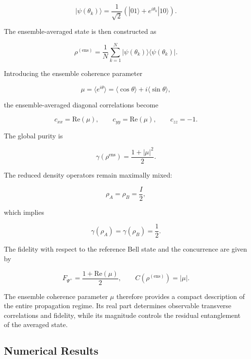 \begin{equation}
|\psi(\theta_k)\rangle
=
\frac{1}{\sqrt{2}}
\left(
|01\rangle + e^{i\theta_k}|10\rangle
\right).
\label{eq:random_phase_realization}
\end{equation}

The ensemble-averaged state is then constructed as

\begin{equation}
\rho^{\mathrm{(ens)}}
=
\frac{1}{N}
\sum_{k=1}^{N}
|\psi(\theta_k)\rangle
\langle\psi(\theta_k)|.
\label{eq:random_phase_ensemble_density_operator}
\end{equation}

Introducing the ensemble coherence parameter

\begin{equation}
\mu
=
\langle e^{i\theta} \rangle
=
\langle \cos\theta \rangle
+
i
\langle \sin\theta \rangle,
\label{eq:ensemble_coherence_parameter}
\end{equation}

the ensemble-averaged diagonal correlations become

\[
c_{xx}
=
\mathrm{Re}(\mu),
\qquad
c_{yy}
=
\mathrm{Re}(\mu),
\qquad
c_{zz}
=
-1.
\]

The global purity is

\[
\gamma(\rho^{\mathrm{ens}})
=
\frac{1 + |\mu|^2}{2}.
\]

The reduced density operators remain maximally mixed:

\[
\rho_A
=
\rho_B
=
\frac{I}{2},
\]

which implies

\[
\gamma(\rho_A)
=
\gamma(\rho_B)
=
\frac{1}{2}.
\]

The fidelity with respect to the reference Bell state and the concurrence are given by

\[
F_{\Psi^+}
=
\frac{1 + \mathrm{Re}(\mu)}{2},
\qquad
C(\rho^{\mathrm{(ens)}})
=
|\mu|.
\]

\medskip

The ensemble coherence parameter \( \mu \) therefore provides a compact description of the entire propagation regime. Its real part determines observable transverse correlations and fidelity, while its magnitude controls the residual entanglement of the averaged state.


\subsection*{Numerical Results}


